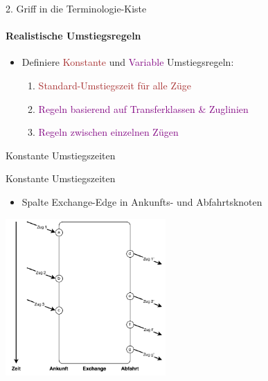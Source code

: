 \begin{frame}{2. Griff in die Terminologie-Kiste}
	\framesubtitle{Realistische Umstiegsregeln}
	\begin{itemize}
		\item Definiere \textcolor{brown}{Konstante} und \textcolor{purple}{Variable} Umstiegsregeln:
		\begin{enumerate}
			\item \textcolor{brown}{Standard-Umstiegszeit für alle Züge}
			\pause
			\item \textcolor{purple}{Regeln basierend auf Transferklassen \& Zuglinien}
			\pause
			\item \textcolor{purple}{Regeln zwischen einzelnen Zügen}
		\end{enumerate}
	\end{itemize}
\end{frame}


\begin{frame}{Konstante Umstiegszeiten}
	\begin{center}
	\end{center}
\end{frame}


\begin{frame}{Konstante Umstiegszeiten}
	\begin{itemize}
		\item Spalte Exchange-Edge in Ankunfts- und Abfahrtsknoten
	\end{itemize}

	\begin{center}
		\includegraphics[height=6cm]{images/time_expanded_constant_interchange_0.pdf} 
	\end{center}
\end{frame}


